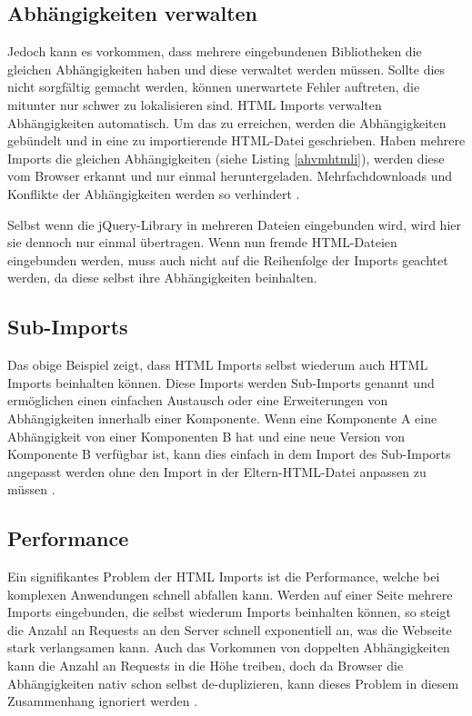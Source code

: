 \subsection{Abhängigkeiten verwalten}\label{abhuxe4ngigkeiten-verwalten}

Jedoch kann es vorkommen, dass mehrere eingebundenen Bibliotheken die gleichen Abhängigkeiten haben und diese verwaltet werden müssen. Sollte dies nicht sorgfältig gemacht werden, können unerwartete Fehler auftreten, die mitunter nur schwer zu lokalisieren sind. \ac{HTML} Imports verwalten Abhängigkeiten automatisch. Um das zu erreichen, werden die Abhängigkeiten gebündelt und in eine zu importierende \ac{HTML}-Datei geschrieben. Haben mehrere Imports die gleichen Abhängigkeiten (siehe Listing \ref{ahvmhtmli}), werden diese vom Browser erkannt und nur einmal heruntergeladen. Mehrfachdownloads und Konflikte der Abhängigkeiten werden so verhindert \cite{citeulike:13853700}.



Selbst wenn die jQuery-Library in mehreren Dateien eingebunden wird, wird hier sie dennoch nur einmal übertragen. Wenn nun fremde \ac{HTML}-Dateien eingebunden werden, muss auch nicht auf die Reihenfolge der Imports geachtet werden, da diese selbst ihre Abhängigkeiten beinhalten.


\subsection{Sub-Imports}\label{sub-imports}

Das obige Beispiel zeigt, dass \ac{HTML} Imports selbst wiederum auch \ac{HTML} Imports beinhalten können. Diese Imports werden Sub-Imports genannt und ermöglichen einen einfachen Austausch oder eine Erweiterungen von Abhängigkeiten innerhalb einer Komponente. Wenn eine Komponente A eine Abhängigkeit von einer Komponenten B hat und eine neue Version von Komponente B verfügbar ist, kann dies einfach in dem Import des Sub-Imports angepasst werden ohne den Import in der Eltern-\ac{HTML}-Datei anpassen zu müssen \cite{citeulike:13853647}.


\subsection{Performance}\label{html-import-performance}

Ein signifikantes Problem der \ac{HTML} Imports ist die Performance, welche bei komplexen Anwendungen schnell abfallen kann. Werden auf einer Seite mehrere Imports eingebunden, die selbst wiederum Imports beinhalten können, so steigt die Anzahl an Requests an den Server schnell exponentiell an, was die Webseite stark verlangsamen kann. Auch das Vorkommen von doppelten Abhängigkeiten kann die Anzahl an Requests in die Höhe treiben, doch da Browser die Abhängigkeiten nativ schon selbst de-duplizieren, kann dieses Problem in diesem Zusammenhang ignoriert werden \cite{citeulike:13853714}.

